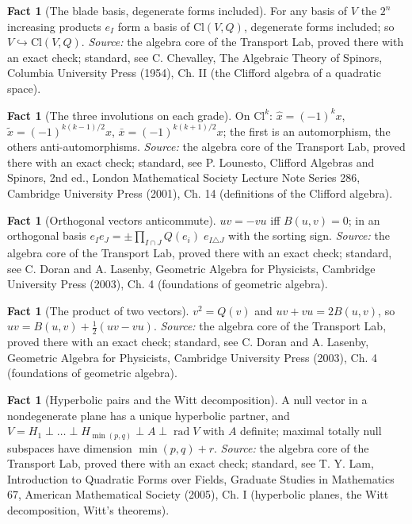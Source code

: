 \documentclass[11pt]{article}
\theoremstyle{definition}
\newtheorem{fact}[theorem]{Fact}
\theoremstyle{plain}
\providecommand{\Cl}{}\renewcommand{\Cl}{\mathrm{Cl}}
\begin{document}
\begin{fact}[The blade basis, degenerate forms included]\label{c:std-algebra.blade-basis}
For any basis of $V$ the $2^{n}$ increasing products $e_I$ form a basis of $\Cl(V, Q)$, degenerate forms included; so $V \hookrightarrow \Cl(V, Q)$.
\emph{Source:} the algebra core of the Transport Lab, proved there with an exact check; standard, see C. Chevalley, The Algebraic Theory of Spinors, Columbia University Press (1954), Ch. II (the Clifford algebra of a quadratic space).
\end{fact}

\begin{fact}[The three involutions on each grade]\label{c:std-algebra.involution-properties}
On $\Cl^{k}$: $\hat{x} = (-1)^{k}x$, $\tilde{x} = (-1)^{k(k-1)/2}x$, $\bar{x} = (-1)^{k(k+1)/2}x$; the first is an automorphism, the others anti-automorphisms.
\emph{Source:} the algebra core of the Transport Lab, proved there with an exact check; standard, see P. Lounesto, Clifford Algebras and Spinors, 2nd ed., London Mathematical Society Lecture Note Series 286, Cambridge University Press (2001), Ch. 14 (definitions of the Clifford algebra).
\end{fact}

\begin{fact}[Orthogonal vectors anticommute]\label{c:std-algebra.orthogonal-anticommute}
$uv = -vu$ iff $B(u,v) = 0$; in an orthogonal basis $e_I e_J = \pm \prod_{I \cap J} Q(e_i)\; e_{I \triangle J}$ with the sorting sign.
\emph{Source:} the algebra core of the Transport Lab, proved there with an exact check; standard, see C. Doran and A. Lasenby, Geometric Algebra for Physicists, Cambridge University Press (2003), Ch. 4 (foundations of geometric algebra).
\end{fact}

\begin{fact}[The product of two vectors]\label{c:std-algebra.vector-squares}
$v^{2} = Q(v)$ and $uv + vu = 2B(u, v)$, so $uv = B(u, v) + \tfrac12(uv - vu)$.
\emph{Source:} the algebra core of the Transport Lab, proved there with an exact check; standard, see C. Doran and A. Lasenby, Geometric Algebra for Physicists, Cambridge University Press (2003), Ch. 4 (foundations of geometric algebra).
\end{fact}

\begin{fact}[Hyperbolic pairs and the Witt decomposition]\label{c:std-algebra.witt-decomposition}
A null vector in a nondegenerate plane has a unique hyperbolic partner, and $V = H_1 \perp \dots \perp H_{\min(p,q)} \perp A \perp \operatorname{rad} V$ with $A$ definite; maximal totally null subspaces have dimension $\min(p,q) + r$.
\emph{Source:} the algebra core of the Transport Lab, proved there with an exact check; standard, see T. Y. Lam, Introduction to Quadratic Forms over Fields, Graduate Studies in Mathematics 67, American Mathematical Society (2005), Ch. I (hyperbolic planes, the Witt decomposition, Witt's theorems).
\end{fact}
\end{document}
